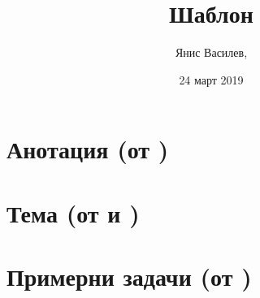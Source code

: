 \documentclass[numbers=endperiod]{scrartcl}
\title{Шаблон}
\author{Янис Василев, \Email{ianis@ivasilev.net}}
\date{24 март 2019}
\begin{document}
\maketitle

\section{Анотация (от \cite{Syllabus})}

\section{Тема (от \cite{Notes} и \cite{Donchev})}

\section{Примерни задачи (от \cite{Notes})}

\printbibliography
\end{document}
